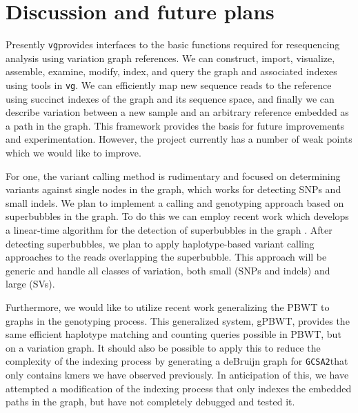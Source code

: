 \documentclass[12pt]{article}
\newcommand{\vg}{{\tt vg}}
\newcommand{\gcsa}{{\tt GCSA2}}
\begin{document}
\section{Discussion and future plans}

Presently \vg provides interfaces to the basic functions required for resequencing analysis using variation graph references.
We can construct, import, visualize, assemble, examine, modify, index, and query the graph and associated indexes using tools in \vg.
We can efficiently map new sequence reads to the reference using succinct indexes of the graph and its sequence space, and finally we can describe variation between a new sample and an arbitrary reference embedded as a path in the graph.
This framework provides the basis for future improvements and experimentation.
However, the project currently has a number of weak points which we would like to improve.

For one, the variant calling method is rudimentary and focused on determining variants against single nodes in the graph, which works for detecting SNPs and small indels.
We plan to implement a calling and genotyping approach based on superbubbles in the graph.
To do this we can employ recent work which develops a linear-time algorithm for the detection of superbubbles in the graph \cite{brankovic2016linear}.
After detecting superbubbles, we plan to apply haplotype-based variant calling approaches \cite{garrison2012haplotype} to the reads overlapping the superbubble.
This approach will be generic and handle all classes of variation, both small (SNPs and indels) and large (SVs).

Furthermore, we would like to utilize recent work generalizing the PBWT to graphs in the genotyping process.
This generalized system, gPBWT, provides the same efficient haplotype matching and counting queries possible in PBWT, but on a variation graph.
It should also be possible to apply this to reduce the complexity of the indexing process by generating a deBruijn graph for \gcsa that only contains kmers we have observed previously.
In anticipation of this, we have attempted a modification of the indexing process that only indexes the embedded paths in the graph, but have not completely debugged and tested it.
\end{document}
